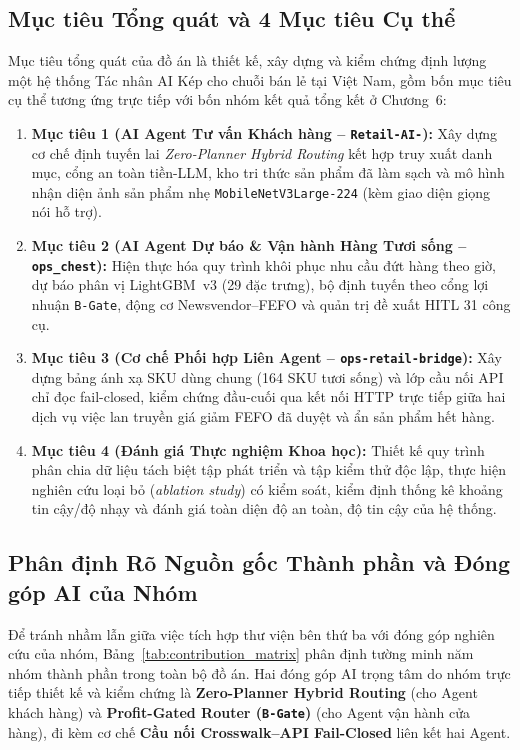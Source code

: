 \subsection*{Mục tiêu Tổng quát và 4 Mục tiêu Cụ thể}
Mục tiêu tổng quát của đồ án là thiết kế, xây dựng và kiểm chứng định lượng một hệ thống Tác nhân AI Kép cho chuỗi bán lẻ tại Việt Nam, gồm bốn mục tiêu cụ thể tương ứng trực tiếp với bốn nhóm kết quả tổng kết ở Chương~6:
\begin{enumerate}
    \item \textbf{Mục tiêu 1 (AI Agent Tư vấn Khách hàng -- \texttt{Retail-AI-}):} Xây dựng cơ chế định tuyến lai \emph{Zero-Planner Hybrid Routing} kết hợp truy xuất danh mục, cổng an toàn tiền-LLM, kho tri thức sản phẩm đã làm sạch và mô hình nhận diện ảnh sản phẩm nhẹ \texttt{MobileNetV3Large-224} (kèm giao diện giọng nói hỗ trợ).
    \item \textbf{Mục tiêu 2 (AI Agent Dự báo \& Vận hành Hàng Tươi sống -- \texttt{ops\_chest}):} Hiện thực hóa quy trình khôi phục nhu cầu đứt hàng theo giờ, dự báo phân vị LightGBM~v3 (29 đặc trưng), bộ định tuyến theo cổng lợi nhuận \texttt{B-Gate}, động cơ Newsvendor--FEFO và quản trị đề xuất HITL 31 công cụ.
    \item \textbf{Mục tiêu 3 (Cơ chế Phối hợp Liên Agent -- \texttt{ops-retail-bridge}):} Xây dựng bảng ánh xạ SKU dùng chung (164 SKU tươi sống) và lớp cầu nối API chỉ đọc fail-closed, kiểm chứng đầu-cuối qua kết nối HTTP trực tiếp giữa hai dịch vụ việc lan truyền giá giảm FEFO đã duyệt và ẩn sản phẩm hết hàng.
    \item \textbf{Mục tiêu 4 (Đánh giá Thực nghiệm Khoa học):} Thiết kế quy trình phân chia dữ liệu tách biệt tập phát triển và tập kiểm thử độc lập, thực hiện nghiên cứu loại bỏ (\emph{ablation study}) có kiểm soát, kiểm định thống kê khoảng tin cậy/độ nhạy và đánh giá toàn diện độ an toàn, độ tin cậy của hệ thống.
\end{enumerate}

\subsection*{Phân định Rõ Nguồn gốc Thành phần và Đóng góp AI của Nhóm}
Để tránh nhầm lẫn giữa việc tích hợp thư viện bên thứ ba với đóng góp nghiên cứu của nhóm, Bảng~\ref{tab:contribution_matrix} phân định tường minh năm nhóm thành phần trong toàn bộ đồ án. Hai đóng góp AI trọng tâm do nhóm trực tiếp thiết kế và kiểm chứng là \textbf{Zero-Planner Hybrid Routing} (cho Agent khách hàng) và \textbf{Profit-Gated Router (\texttt{B-Gate})} (cho Agent vận hành cửa hàng), đi kèm cơ chế \textbf{Cầu nối Crosswalk--API Fail-Closed} liên kết hai Agent.

